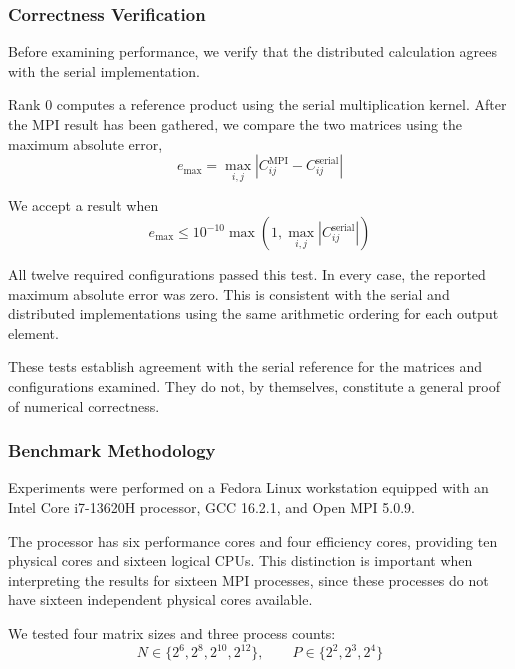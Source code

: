 \subsubsection{Correctness Verification}

Before examining performance, we verify that the distributed calculation agrees with the serial implementation.

Rank 0 computes a reference product using the serial multiplication kernel. After the MPI result has been gathered, we compare the two matrices using the maximum absolute error,
\begin{equation}
	e_{\max}
	=
	\max_{i,j}
	\left|
	C_{ij}^{\mathrm{MPI}}
	-
	C_{ij}^{\mathrm{serial}}
	\right|
\end{equation}

We accept a result when
\begin{equation}
	e_{\max}
	\leq
	10^{-10}
	\max\left(
	1,
	\max_{i,j}|C_{ij}^{\mathrm{serial}}|
	\right)
\end{equation}

All twelve required configurations passed this test. In every case, the reported maximum absolute error was zero. This is consistent with the serial and distributed implementations using the same arithmetic ordering for each output element.

These tests establish agreement with the serial reference for the matrices and configurations examined. They do not, by themselves, constitute a general proof of numerical correctness.

\subsubsection{Benchmark Methodology}

Experiments were performed on a Fedora Linux workstation equipped with an Intel Core i7-13620H processor, GCC 16.2.1, and Open MPI 5.0.9.

The processor has six performance cores and four efficiency cores, providing ten physical cores and sixteen logical CPUs. This distinction is important when interpreting the results for sixteen MPI processes, since these processes do not have sixteen independent physical cores available.

We tested four matrix sizes and three process counts:
\begin{equation}
	N\in\{2^6,2^8,2^{10},2^{12}\},
	\qquad
	P\in\{2^2,2^3,2^4\}
\end{equation}

